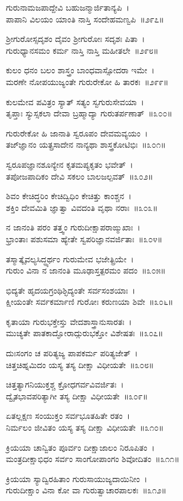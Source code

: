 ಗುರುನಾಮಜಪಾದ್ದೇವಿ ಬಹುಜನ್ಮಾರ್ಜಿತಾನ್ಯಪಿ~।\\
ಪಾಪಾನಿ ವಿಲಯಂ ಯಾಂತಿ ನಾಸ್ತಿ ಸಂದೇಹಮಣ್ವಪಿ~॥೨೯೭॥

ಶ್ರೀಗುರೋಸ್ಸದೃಶಂ ದೈವಂ ಶ್ರೀಗುರೋಃ ಸದೃಶಃ ಪಿತಾ~।\\
ಗುರುಧ್ಯಾನಸಮಂ ಕರ್ಮ ನಾಸ್ತಿ ನಾಸ್ತಿ ಮಹೀತಲೇ~॥೨೯೮॥

ಕುಲಂ ಧನಂ ಬಲಂ ಶಾಸ್ತ್ರಂ ಬಾಂಧವಾಸ್ಸೋದರಾ ಇಮೇ~।\\
ಮರಣೇ ನೋಪಯುಜ್ಯಂತೇ ಗುರುರೇಕೋ ಹಿ ತಾರಕಃ~॥೨೯೯॥

ಕುಲಮೇವ ಪವಿತ್ರಂ ಸ್ಯಾತ್ ಸತ್ಯಂ ಸ್ವಗುರುಸೇವಯಾ~।\\
ತೃಪ್ತಾಃ ಸ್ಯುಸ್ಸಕಲಾ ದೇವಾ ಬ್ರಹ್ಮಾದ್ಯಾ ಗುರುತರ್ಪಣಾತ್~॥೩೦೦॥

ಗುರುರೇಕೋ ಹಿ ಜಾನಾತಿ ಸ್ವರೂಪಂ ದೇವಮವ್ಯಯಂ~।\\
ತಜ‌್‌ಜ್ಞಾನಂ ಯತ್ಪ್ರಸಾದೇನ ನಾನ್ಯಥಾ ಶಾಸ್ತ್ರಕೋಟಿಭಿಃ~॥೩೦೧॥

ಸ್ವರೂಪಜ್ಞಾನಶೂನ್ಯೇನ ಕೃತಮಪ್ಯಕೃತಂ ಭವೇತ್~।\\
ತಪೋಜಪಾದಿಕಂ ದೇವಿ ಸಕಲಂ ಬಾಲಜಲ್ಪವತ್~॥೩೦೨॥

ಶಿವಂ ಕೇಚಿದ್ಧರಿಂ ಕೇಚಿದ್ವಿಧಿಂ ಕೇಚಿತ್ತು ಕಾಂಶ್ಚನ~।\\
ಶಕ್ತಿಂ ದೇವಮಿತಿ ಜ್ಞಾತ್ವಾ ವಿವದಂತಿ ವೃಥಾ ನರಾಃ~॥೩೦೩॥

ನ ಜಾನಂತಿ ಪರಂ ತತ್ತ್ವಂ ಗುರುದೀಕ್ಷಾಪರಾಙ್ಮುಖಾಃ~।\\
ಭ್ರಾಂತಾಃ ಪಶುಸಮಾ ಹ್ಯೇತೇ ಸ್ವಪರಿಜ್ಞಾನವರ್ಜಿತಾಃ~॥೩೦೪॥

ತಸ್ಮಾತ್ಕೈವಲ್ಯಸಿದ್ಧ್ಯರ್ಥಂ ಗುರುಮೇವ ಭಜೇತ್ಪ್ರಿಯೇ~।\\
ಗುರುಂ ವಿನಾ ನ ಜಾನಂತಿ ಮೂಢಾಸ್ತತ್ಪರಮಂ ಪದಂ~॥೩೦೫॥

ಭಿದ್ಯತೇ ಹೃದಯಗ್ರಂಥಿಶ್ಛಿದ್ಯಂತೇ ಸರ್ವಸಂಶಯಾಃ~।\\
ಕ್ಷೀಯಂತೇ ಸರ್ವಕರ್ಮಾಣಿ ಗುರೋಃ ಕರುಣಯಾ ಶಿವೇ~॥೩೦೬॥

ಕೃತಾಯಾ ಗುರುಭಕ್ತೇಸ್ತು ವೇದಶಾಸ್ತ್ರಾನುಸಾರತಃ~।\\
ಮುಚ್ಯತೇ ಪಾತಕಾದ್ಘೋರಾದ್ಗುರುಭಕ್ತೋ ವಿಶೇಷತಃ~॥೩೦೭॥

ದುಃಸಂಗಂ ಚ ಪರಿತ್ಯಜ್ಯ ಪಾಪಕರ್ಮ ಪರಿತ್ಯಜೇತ್~।\\
ಚಿತ್ತಚಿಹ್ನಮಿದಂ ಯಸ್ಯ ತಸ್ಯ ದೀಕ್ಷಾ ವಿಧೀಯತೇ~॥೩೦೮॥

ಚಿತ್ತತ್ಯಾಗನಿಯುಕ್ತಶ್ಚ ಕ್ರೋಧಗರ್ವವಿವರ್ಜಿತಃ~।\\
ದ್ವೈತಭಾವಪರಿತ್ಯಾಗೀ ತಸ್ಯ ದೀಕ್ಷಾ ವಿಧೀಯತೇ~॥೩೦೯॥

ಏತಲ್ಲಕ್ಷಣ ಸಂಯುಕ್ತಂ ಸರ್ವಭೂತಹಿತೇ ರತಂ~।\\
ನಿರ್ಮಲಂ ಜೀವಿತಂ ಯಸ್ಯ ತಸ್ಯ ದೀಕ್ಷಾ ವಿಧೀಯತೇ~॥೩೧೦॥

ಕ್ರಿಯಯಾ ಚಾನ್ವಿತಂ ಪೂರ್ವಂ ದೀಕ್ಷಾಜಾಲಂ ನಿರೂಪಿತಂ~।\\
ಮಂತ್ರದೀಕ್ಷಾಭಿಧಂ ಸರ್ವಂ  ಸಾಂಗೋಪಾಂಗಂ ಶಿವೋದಿತಂ~॥೩೧೧॥

ಕ್ರಿಯಯಾ ಸ್ಯಾದ್ವಿರಹಿತಾಂ ಗುರುಸಾಯುಜ್ಯದಾಯಿನೀಂ~।\\
ಗುರುದೀಕ್ಷಾಂ ವಿನಾ ಕೋ ವಾ ಗುರುತ್ವಾಚಾರಪಾಲಕಃ~॥೩೧೨॥

